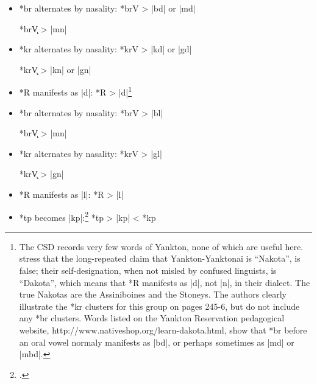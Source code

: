 \documentclass[output=paper]{LSP/langsci}
\begin{document}

\begin{itemize}
\item *br alternates by nasality: \hspace{1em} *brV	>	|bd| or |md|

\hspace{12em} *br\k{V} 	>	|mn|
\item  *kr alternates by nasality:  \hspace{1.2em} *krV       >          |kd| or |gd|

\hspace{12em} *kr\k{V} 	>	|kn| or |gn|

\item *R manifests as |d|: \hspace{4.5em} *R	>	|d|\footnote{The CSD records very few words of Yankton, none of which are useful here.  \citet{ParksDeMallie1992} stress that the long-repeated claim that Yankton-Yanktonai is ``Nakota'', is false; their self-designation, when not misled by confused linguists, is ``Dakota'', which means that *R manifests as |d|, not |n|, in their dialect.  The true Nakotas are the Assiniboines and the Stoneys.  The authors clearly illustrate the *kr clusters for this group on pages 245-6, but do not include any *br clusters.  Words listed on the Yankton Reservation pedagogical website, http://www.nativeshop.org/learn-dakota.html, show that *br before an oral vowel normaly manifests as |bd|, or perhaps sometimes as |md| or |mbd|.}
\end{itemize}


\begin{itemize}
\item  *br alternates by nasality:  \hspace{1em} *brV	>	|bl|

\hspace{12em} *br\k{V}	>	|mn|

\item  *kr alternates by nasality: \hspace{1em}   *krV       >          |gl|

\hspace{12em} *kr\k{V}	>	|gn|
\item *R manifests as |l|: \hspace{4.5em} *R	>	|l|
\item *tp becomes |kp|:\footnote{\citealt[253, 265, 865]{Rankinetal2006PDF}.} \hspace{4.5em} *tp	>	|kp|	 <	*kp
 \end{itemize}
 
\end{document}
